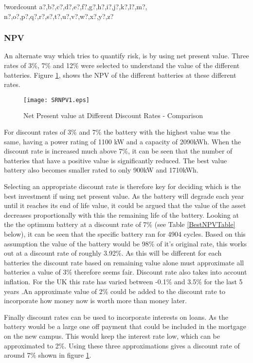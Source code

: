 \documentclass[fontsize=9.5pt]{extarticle}
\numberwithin{figure}{section} %
\newcounter{words}
\newenvironment{counted}{%
  \setcounter{words}{0}
  \SearchList!{wordcount}{\stepcounter{words}}
    {a?,b?,c?,d?,e?,f?,g?,h?,i?,j?,k?,l?,m?,
    n?,o?,p?,q?,r?,s?,t?,u?,v?,w?,x?,y?,z?}
  \UndoBoundary{'}
  \SearchOrder{p;}}{%
  \StopSearching}
\begin{document}
\begin{counted}
\subsubsection{NPV}\label{npv}

An alternate way which tries to quantify risk, is by using net present
value. Three rates of 3\%, 7\% and 12\% were selected to understand the
value of the different batteries. Figure \ref{SRNPV1}, shows the NPV of
the different batteries at these different rates.

\begin{figure}[H]
 \centering
 \texttt{[image: SRNPV1.eps]}
 \caption{Net Present value at Different Discount Rates - Comparison}
 \label{SRNPV1}
\end{figure}

For discount rates of 3\% and 7\% the battery with the highest value was
the same, having a power rating of 1100 kW and a capacity of 2090kWh.
When the discount rate is increased much above 7\%, it can be seen that
the number of batteries that have a positive value is significantly
reduced. The best value battery also becomes smaller rated to only 900kW
and 1710kWh.

Selecting an appropriate discount rate is therefore key for deciding
which is the best investment if using net present value. As the battery
will degrade each year until it reaches its end of life value, it could
be argued that the value of the asset decreases proportionally with this
the remaining life of the battery. Looking at the the optimum battery at
a discount rate of 7\% (see Table \ref{BestNPVTable} below), it can be
seen that the specific battery ran for 4904 cycles. Based on this
assumption the value of the battery would be 98\% of it's original rate,
this works out at a discount rate of roughly 3.92\%. As this will be
different for each batteries the discount rate based on remaining value
alone must approximate all batteries a value of 3\% therefore seems
fair. Discount rate also takes into account inflation. For the UK this
rate has varied between -0.1\% and 3.5\% for the last 5 years
\cite{UnitedKi95:online}.An approximate value of 2\% could be added to
the discount rate to incorporate how money now is worth more than money
later.

Finally discount rates can be used to incorporate interests on loans. As
the battery would be a large one off payment that could be included in
the mortgage on the new campus. This would keep the interest rate low,
which can be approximated to 2\%. Using these three approximations gives
a discount rate of around 7\% shown in figure \ref{SRNPV1}.


\end{counted}
\end{document}
